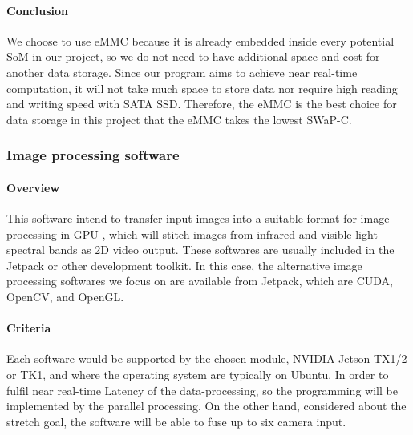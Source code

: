 \paragraph{Conclusion}
We choose to use eMMC because it is already embedded inside every potential SoM in our project, so we do 
not need to have additional space and cost for another data storage. Since our program aims to achieve 
near real-time computation, it will not take much space to store data nor require high reading and 
writing speed with SATA SSD. Therefore, the eMMC is the best choice for data storage in this project that 
the eMMC takes the lowest SWaP-C.\\



\subsubsection{Image processing software}
\paragraph{Overview}
This software intend to transfer input images into a suitable format for image processing in GPU
, which will stitch images from infrared and visible light spectral bands as 2D video output. 
These softwares are usually included in the Jetpack or other development toolkit. In this case, 
the alternative image processing softwares we focus on are available from Jetpack, which are CUDA, 
OpenCV, and OpenGL.\\

\paragraph{Criteria}
Each software would be supported by the chosen module, NVIDIA Jetson TX1/2 or TK1, and where 
the operating system are typically on Ubuntu. In order to fulfil near real-time Latency of 
the data-processing, so the programming will be implemented by the parallel processing. On 
the other hand, considered about the stretch goal, the software will be able to fuse up to 
six camera input.\\

